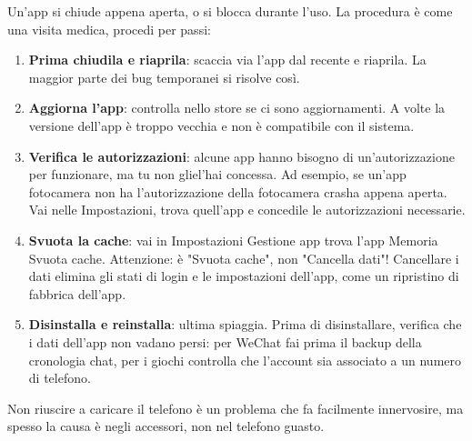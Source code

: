 
Un'app si chiude appena aperta, o si blocca durante l'uso. La procedura è come una visita medica, procedi per passi:

\begin{enumerate}
  \item \textbf{Prima chiudila e riaprila}: scaccia via l'app dal recente e riaprila. La maggior parte dei bug temporanei si risolve così.
  \item \textbf{Aggiorna l'app}: controlla nello store se ci sono aggiornamenti. A volte la versione dell'app è troppo vecchia e non è compatibile con il sistema.
  \item \textbf{Verifica le autorizzazioni}: alcune app hanno bisogno di un'autorizzazione per funzionare, ma tu non gliel'hai concessa. Ad esempio, se un'app fotocamera non ha l'autorizzazione della fotocamera crasha appena aperta. Vai nelle Impostazioni, trova quell'app e concedile le autorizzazioni necessarie.
  \item \textbf{Svuota la cache}: vai in Impostazioni Gestione app trova l'app Memoria Svuota cache. Attenzione: è "Svuota cache", non "Cancella dati"! Cancellare i dati elimina gli stati di login e le impostazioni dell'app, come un ripristino di fabbrica dell'app.
  \item \textbf{Disinstalla e reinstalla}: ultima spiaggia. Prima di disinstallare, verifica che i dati dell'app non vadano persi: per WeChat fai prima il backup della cronologia chat, per i giochi controlla che l'account sia associato a un numero di telefono.
\end{enumerate}


Non riuscire a caricare il telefono è un problema che fa facilmente innervosire, ma spesso la causa è negli accessori, non nel telefono guasto.

